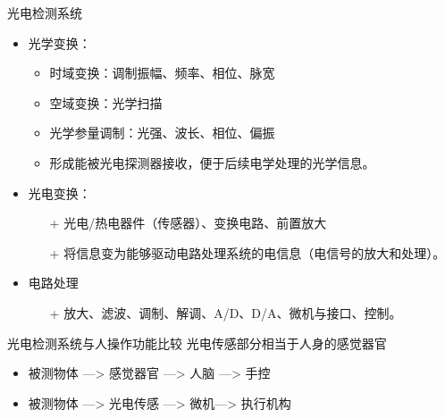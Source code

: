 \documentclass[10pt]{beamer}
\begin{document}
\begin{frame}{光电检测系统}
    \begin{itemize}
        \item 光学变换：\\
            \begin{itemize}
            \item<2-| alert@2>[+] 时域变换：调制振幅、频率、相位、脉宽
            \item<2-| alert@3>[+] 空域变换：光学扫描
            \item<2-| alert@4>[+] 光学参量调制：光强、波长、相位、偏振
            \item<2-| alert@5>[+] 形成能被光电探测器接收，便于后续电学处理的光学信息。
                \end{itemize}
        \item 光电变换：\\
                \begin{itemize}
            \item[+] 光电/热电器件（传感器）、变换电路、前置放大

            \item[+] 将信息变为能够驱动电路处理系统的电信息（电信号的放大和处理）。
                \end{itemize}
        \item 电路处理\\
        \begin{itemize}
            \item[+] 放大、滤波、调制、解调、A/D、D/A、微机与接口、控制。
           \end{itemize}     

    \end{itemize}

\end{frame}
\begin{frame}{光电检测系统与人操作功能比较}
光电传感部分相当于人身的感觉器官
    \begin{itemize}
        \item 被测物体  ---> 感觉器官  ---> 人脑 ---> 手控  
        \item 被测物体 ---> 光电传感 ---> 微机---> 执行机构
    \end{itemize}
\end{frame}
\end{document}
